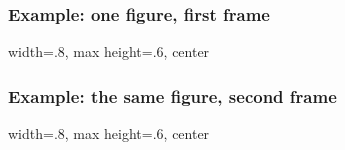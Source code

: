 
\begin{frame}
    \frametitle{Example: one figure, first frame}

    \pgfmathsetmacro{}
    \pgfmathsetmacro{}
    \pgfmathsetmacro{}
    \pgfmathsetmacro{}

    \begin{adjustbox}{width=.8\linewidth, max height=.6\textheight, center}
        
    \end{adjustbox}

\end{frame}

\begin{frame}
    \frametitle{Example: the same figure, second frame}

    \pgfmathsetmacro{}
    \pgfmathsetmacro{}
    \pgfmathsetmacro{}
    \pgfmathsetmacro{}

    \begin{adjustbox}{width=.8\linewidth, max height=.6\textheight, center}
        
    \end{adjustbox}

\end{frame}
